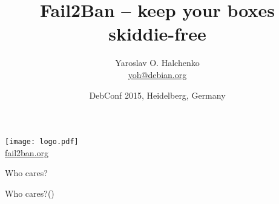 \documentclass[]{beamer}
\title[Fail2Ban]{Fail2Ban -- keep your boxes skiddie-free}
\author[yoh AKA Yarik]{Yaroslav O. Halchenko\\
  \href{mailto: yoh@debian.org}{yoh@debian.org}}
\institute[Dartmouth, (Neuro)Debian]{
\href{http://centerforopenneuroscience.org}{Center for Open Neuroscience},
\href{http://www.dartmouth.edu}{Dartmouth College},\\
\href{http://www.debian.org}{Debian}/\href{http://neuro.debian.net}{NeuroDebian}
}
\date[DebConf 2015]{DebConf 2015, Heidelberg, Germany}
\begin{document}
\frame{\titlepage}

\begin{frame}{}
\begin{center}
\texttt{[image: logo.pdf]}
\\
\href{http://fail2ban.org}{fail2ban.org}
\end{center}
\end{frame}

\begin{frame}{}
\begin{center}
\Large Who cares?
\end{center}
\end{frame}

\begin{frame}{Who cares?()}
\begin{center}
\end{center}
\end{frame}
\end{document}
